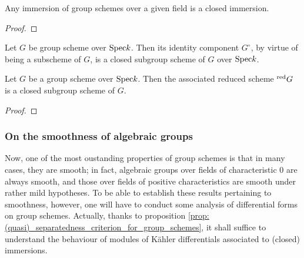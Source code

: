             \begin{proposition} \label{prop: subgroup_schemes_are_closed_over_fields}
                Any immersion of group schemes over a given field is a closed immersion.
            \end{proposition}
                \begin{proof}
                    
                \end{proof}
            \begin{corollary}
                Let $G$ be group scheme over $\mathrm{Spec} k$. Then its identity component $G^{\circ}$, by virtue of being a subscheme of $G$, is a closed subgroup scheme of $G$ over $\mathrm{Spec} k$.
            \end{corollary}
            
            \begin{proposition} \label{prop: associated_reduced_group_scheme}
                Let $G$ be a group scheme over $\mathrm{Spec} k$. Then the associated reduced scheme ${}^{\mathrm{red}}G$ is a closed subgroup scheme of $G$.
            \end{proposition}
                \begin{proof}
                    
                \end{proof}
                
        \subsubsection{On the smoothness of algebraic groups}
            Now, one of the most oustanding properties of group schemes is that in many cases, they are smooth; in fact, algebraic groups over fields of characteristic $0$ are always smooth, and those over fields of positive characteristics are smooth under rather mild hypotheses. To be able to establish these results pertaining to smoothness, however, one will have to conduct some analysis of differential forms on group schemes. Actually, thanks to proposition \ref{prop: (quasi)_separatedness_criterion_for_group_schemes}, it shall suffice to understand the behaviour of modules of K\"ahler differentials associated to (closed) immersions.
            
